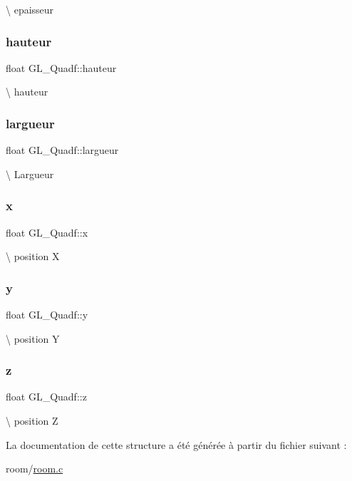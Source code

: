 \textbackslash{} epaisseur \mbox{\label{struct_g_l___quadf_a78bc225ce25f93b9de79ef1ca707a50e}} 
\subsubsection{\texorpdfstring{hauteur}{hauteur}}
{\footnotesize\ttfamily float G\+L\+\_\+\+Quadf\+::hauteur}

\textbackslash{} hauteur \mbox{\label{struct_g_l___quadf_ada25d106338ba16ff6e8b7fdead87264}} 
\subsubsection{\texorpdfstring{largueur}{largueur}}
{\footnotesize\ttfamily float G\+L\+\_\+\+Quadf\+::largueur}

\textbackslash{} Largueur \mbox{\label{struct_g_l___quadf_aec36eeea9c60ec7ad4a9f5a8cc8224af}} 
\subsubsection{\texorpdfstring{x}{x}}
{\footnotesize\ttfamily float G\+L\+\_\+\+Quadf\+::x}

\textbackslash{} position X \mbox{\label{struct_g_l___quadf_a7f8b67ef0f48272d9b4b354f92e36c07}} 
\subsubsection{\texorpdfstring{y}{y}}
{\footnotesize\ttfamily float G\+L\+\_\+\+Quadf\+::y}

\textbackslash{} position Y \mbox{\label{struct_g_l___quadf_ac22f8d2876a5b047db37b09dd02edc89}} 
\subsubsection{\texorpdfstring{z}{z}}
{\footnotesize\ttfamily float G\+L\+\_\+\+Quadf\+::z}

\textbackslash{} position Z 

La documentation de cette structure a été générée à partir du fichier suivant \+:\begin{DoxyCompactItemize}
\item 
room/\hyperlink{room_8c}{room.\+c}\end{DoxyCompactItemize}
